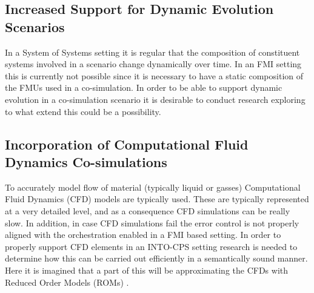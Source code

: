 
\subsection{Increased Support for Dynamic Evolution Scenarios}

In a System of Systems setting it is regular that the composition of constituent systems involved in a scenario change dynamically  over time. In an FMI setting this is currently not possible since it is necessary to have a static composition of the FMUs used in a co-simulation. In order to be able to support dynamic evolution in a co-simulation scenario it is desirable to conduct research exploring to what extend this could be a possibility.


\subsection{Incorporation of Computational Fluid Dynamics Co-simulations}

To accurately model flow of material (typically liquid or gasses) Computational Fluid Dynamics (CFD) models are typically used. These are typically represented at a very detailed level, and as a consequence CFD simulations can be really slow. In addition, in case CFD simulations fail the error control is not properly aligned with the orchestration enabled in a FMI based setting. In order to properly support CFD elements in an INTO-CPS setting research is needed to determine how this can be carried out efficiently in a semantically sound manner. Here it is imagined that a part of this will be approximating the CFDs with Reduced Order Models (ROMs) \cite{Carlberg&13}.


